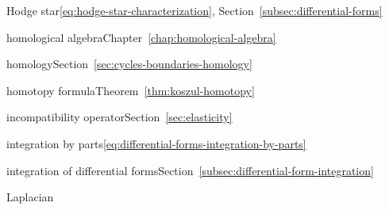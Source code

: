 \par\noindent\hspace*{0em}\label{index:hodge-star}{Hodge star}\quad \eqref{eq:hodge-star-characterization}, Section~\ref{subsec:differential-forms}

\par\noindent\hspace*{0em}\label{index:homological-algebra}{homological algebra}\quad Chapter~\ref{chap:homological-algebra}

\par\noindent\hspace*{0em}\label{index:homology}{homology}\quad Section~\ref{sec:cycles-boundaries-homology}

\par\noindent\hspace*{0em}\label{index:homotopy-formula}{homotopy formula}\quad Theorem~\ref{thm:koszul-homotopy}

\par\noindent\hspace*{0em}\label{index:incompatibility-operator}{incompatibility operator}\quad Section~\ref{sec:elasticity}

\par\noindent\hspace*{0em}\label{index:integration-by-parts}{integration by parts}\quad \eqref{eq:differential-forms-integration-by-parts}

\par\noindent\hspace*{0em}\label{index:integration-of-differential-forms}{integration of differential forms}\quad Section~\ref{subsec:differential-form-integration}

\par\noindent\hspace*{0em}\label{index:laplacian}{Laplacian}

